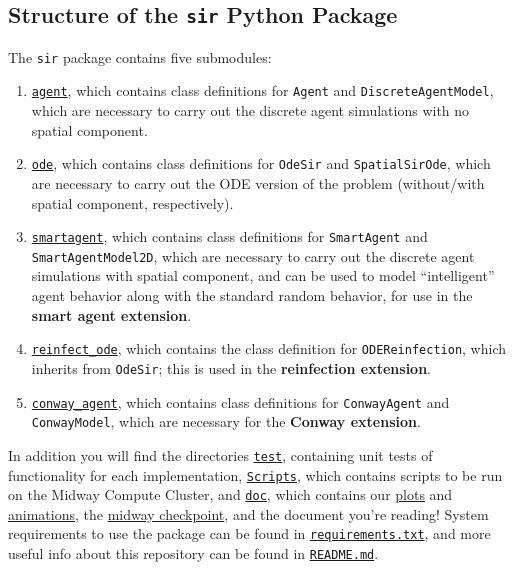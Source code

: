 \documentclass[twoside]{extarticle}                                    %
\numberwithin{equation}{section}                                       %
\begin{document}
\subsection{Structure of the \texttt{sir} Python Package}
The \texttt{sir} package contains five submodules:
\begin{enumerate}[label = (\roman*), itemsep = 0em]
    \item \href{https://github.com/caam37830/project-group-8/blob/main/sir/agent.py}{\texttt{agent}}, which contains class definitions for \texttt{Agent} and \texttt{DiscreteAgentModel}, which are necessary to carry out the discrete agent simulations with no spatial component.
    \item \href{https://github.com/caam37830/project-group-8/blob/main/sir/ode.py}{\texttt{ode}}, which contains class definitions for \texttt{OdeSir} and \texttt{SpatialSirOde}, which are necessary to carry out the ODE version of the problem (without/with spatial component, respectively).
    \item \href{https://github.com/caam37830/project-group-8/blob/main/sir/smartagent.py}{\texttt{smartagent}}, which contains class definitions for \texttt{SmartAgent} and \texttt{SmartAgentModel2D}, which are necessary to carry out the discrete agent simulations with spatial component, and can be used to model “intelligent” agent behavior along with the standard random behavior, for use in the \textbf{smart agent extension}.
    \item \href{https://github.com/caam37830/project-group-8/blob/main/sir/reinfect_ode.py}{\texttt{reinfect\_ode}}, which contains the class definition for \texttt{ODEReinfection}, which inherits from \texttt{OdeSir}; this is used in the \textbf{reinfection extension}.
    \item \href{https://github.com/caam37830/project-group-8/blob/main/sir/conway_agent.py}{\texttt{conway\_agent}}, which contains class definitions for \texttt{ConwayAgent} and \texttt{ConwayModel}, which are necessary for the \textbf{Conway extension}.
\end{enumerate}
In addition you will find the directories \href{https://github.com/caam37830/project-group-8/tree/main/test}{\texttt{test}}, containing unit tests of functionality for each implementation, \href{https://github.com/caam37830/project-group-8/tree/main/Scripts}{\texttt{Scripts}}, which contains scripts to be run on the Midway Compute Cluster, and \href{https://github.com/caam37830/project-group-8/tree/main/doc}{\texttt{doc}}, which contains our \href{https://github.com/caam37830/project-group-8/tree/main/doc/final/plots}{plots} and \href{https://github.com/caam37830/project-group-8/tree/main/doc/final/conway_plots}{animations}, the \href{https://github.com/caam37830/project-group-8/blob/main/doc/checkpoint/checkpoint.md}{midway checkpoint}, and the document you're reading! System requirements to use the package can be found in \href{https://github.com/caam37830/project-group-8/blob/main/requirements.txt}{\texttt{requirements.txt}}, and more useful info about this repository can be found in \href{https://github.com/caam37830/project-group-8/blob/main/README.md}{\texttt{README.md}}.
\end{document}
